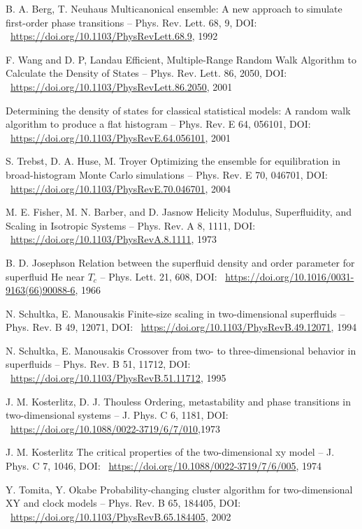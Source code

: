 \documentclass[11pt]{article}
\begin{document}
\begin{thebibliography}{3}
B. A. Berg,  T. Neuhaus Multicanonical ensemble: A new approach to simulate first-order phase transitions -- Phys. Rev. Lett. 68, 9, DOI: ~\url{https://doi.org/10.1103/PhysRevLett.68.9}, 1992

F. Wang and D. P, Landau Efficient, Multiple-Range Random Walk Algorithm to Calculate the Density of States -- Phys. Rev. Lett. 86, 2050, DOI: ~\url{https://doi.org/10.1103/PhysRevLett.86.2050}, 2001

Determining the density of states for classical statistical models: A random walk algorithm to produce a flat histogram -- Phys. Rev. E 64, 056101, DOI: ~\url{https://doi.org/10.1103/PhysRevE.64.056101}, 2001

S. Trebst, D. A. Huse, M. Troyer Optimizing the ensemble for equilibration in broad-histogram Monte Carlo simulations -- Phys. Rev. E 70, 046701, DOI: ~\url{https://doi.org/10.1103/PhysRevE.70.046701}, 2004

M. E. Fisher, M. N. Barber, and D. Jasnow Helicity Modulus, Superfluidity, and Scaling in Isotropic Systems -- Phys. Rev. A 8, 1111, DOI: ~\url{https://doi.org/10.1103/PhysRevA.8.1111}, 1973

B. D. Josephson Relation between the superfluid density and order parameter for superfluid He near $T_c$ --  Phys. Lett. 21, 608, DOI: ~\url{https://doi.org/10.1016/0031-9163(66)90088-6}, 1966

N. Schultka, E. Manousakis Finite-size scaling in two-dimensional superfluids -- Phys. Rev. B 49, 12071, DOI: ~\url{https://doi.org/10.1103/PhysRevB.49.12071}, 1994

N. Schultka, E. Manousakis Crossover from two- to three-dimensional behavior in superfluids -- Phys. Rev. B 51, 11712, DOI: ~\url{https://doi.org/10.1103/PhysRevB.51.11712}, 1995

J. M. Kosterlitz, D. J. Thouless Ordering, metastability and phase transitions in two-dimensional systems -- J. Phys. C 6, 1181, DOI: ~\url{https://doi.org/10.1088/0022-3719/6/7/010},1973

 J. M. Kosterlitz The critical properties of the two-dimensional xy model -- J. Phys. C 7, 1046, DOI: ~\url{https://doi.org/10.1088/0022-3719/7/6/005}, 1974

Y. Tomita, Y. Okabe Probability-changing cluster algorithm for two-dimensional XY and clock models -- Phys. Rev. B 65, 184405, DOI: ~\url{https://doi.org/10.1103/PhysRevB.65.184405}, 2002


\end{thebibliography}
\end{document}
